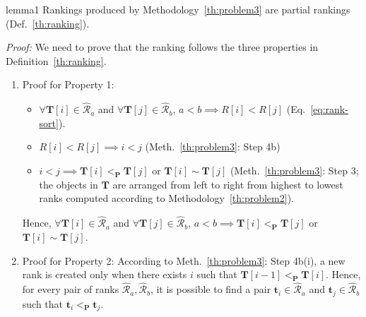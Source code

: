 \documentclass[acmsmall,screen, review]{acmart}
\begin{document}
\begin{mylem}{}{lemma1}
	Rankings produced by Methodology~\ref{th:problem3} are partial rankings (Def.~\ref{th:ranking}).
\end{mylem}
\noindent \textit{Proof: } We need to prove that the ranking follows the three properties in Definition~\ref{th:ranking}.
\begin{enumerate}
	\item Proof for Property 1:
	\begin{itemize}
			\item $\forall \mathbf{T}[i] \in \mathcal{\hat{R}}_a$ and  $\forall \mathbf{T}[j] \in \mathcal{\hat{R}}_b$, $a<b \implies R[i] < R[j]$ (Eq.~\ref{eq:rank-sort}).
			\item $R[i] < R[j] \implies i<j$  (Meth.~\ref{th:problem3}: Step 4b)
			\item $i<j \implies \mathbf{T}[i] <_{\mathbf{P}} \mathbf{T}[j]$ or $\mathbf{T}[i] \sim \mathbf{T}[j]$ (Meth.~\ref{th:problem3}: Step 3; the objects in $\mathbf{T}$ are arranged from left to right from highest to lowest ranks computed according to Methodology~\ref{th:problem2}).
		\end{itemize}
	Hence, $\forall \mathbf{T}[i] \in \mathcal{\hat{R}}_a$ and  $\forall \mathbf{T}[j] \in \mathcal{\hat{R}}_b$, $a<b \implies\mathbf{T}[i] <_{\mathbf{P}} \mathbf{T}[j]$ or $\mathbf{T}[i] \sim \mathbf{T}[j]$.
	
	\item Proof for Property 2: According to Meth.~\ref{th:problem3}: Step 4b(i), a new rank is created only when there exists $i$ such that $\mathbf{T}[i-1]  <_{\mathbf{P}} \mathbf{T}[i]$. Hence, for every pair of ranks $\mathcal{\hat{R}}_a, \mathcal{\hat{R}}_b$, it is possible to find a pair $\mathbf{t}_i \in \mathcal{\hat{R}}_a$ and $\mathbf{t}_j \in \mathcal{\hat{R}}_b$ such that $\mathbf{t}_i <_{\mathbf{P}} \mathbf{t}_j$.   
	
	

\end{enumerate}
\end{document}

